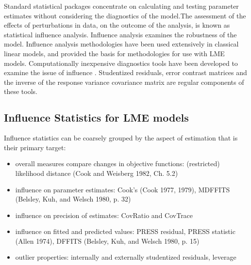 Standard statistical packages concentrate on calculating and testing parameter estimates without considering the diagnostics of the model.The assessment of the effects of perturbations in data, on the outcome of the analysis, is known as statistical influence analysis. Influence analysis examines the robustness of the model. Influence analysis methodologies have been used extensively in classical linear models, and provided the basis for methodologies for use with LME models.
Computationally inexpensive diagnostics tools have been developed to examine the issue of influence \citep{Zewotir}.
Studentized residuals, error contrast matrices and the inverse of the response variance covariance matrix are regular components of these tools.

\subsection{Influence Statistics for LME models} %
Influence statistics can be coarsely grouped by the aspect of estimation that is their primary target:
\begin{itemize}
\item overall measures compare changes in objective functions: (restricted) likelihood distance (Cook and Weisberg 1982, Ch. 5.2)
\item influence on parameter estimates: Cook's  (Cook 1977, 1979), MDFFITS (Belsley, Kuh, and Welsch 1980, p. 32)
\item influence on precision of estimates: CovRatio and CovTrace
\item influence on fitted and predicted values: PRESS residual, PRESS statistic (Allen 1974), DFFITS (Belsley, Kuh, and Welsch 1980, p. 15)
\item outlier properties: internally and externally studentized residuals, leverage
\end{itemize}
